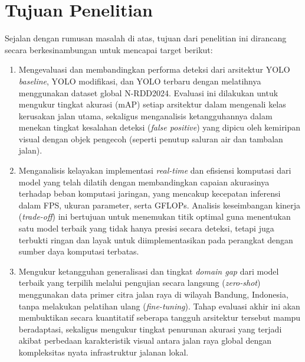 \section{Tujuan Penelitian}
Sejalan dengan rumusan masalah di atas, tujuan dari penelitian ini dirancang secara berkesinambungan untuk mencapai target berikut:
\begin{enumerate}
  \item Mengevaluasi dan membandingkan performa deteksi dari arsitektur YOLO \textit{baseline}, YOLO modifikasi, dan YOLO terbaru dengan melatihnya menggunakan dataset global N-RDD2024. Evaluasi ini dilakukan untuk mengukur tingkat akurasi (mAP) setiap arsitektur dalam mengenali kelas kerusakan jalan utama, sekaligus menganalisis ketangguhannya dalam menekan tingkat kesalahan deteksi (\textit{false positive}) yang dipicu oleh kemiripan visual dengan objek pengecoh (seperti penutup saluran air dan tambalan jalan).

  \item Menganalisis kelayakan implementasi \textit{real-time} dan efisiensi komputasi dari model yang telah dilatih dengan membandingkan capaian akurasinya terhadap beban komputasi jaringan, yang mencakup kecepatan inferensi dalam FPS, ukuran parameter, serta GFLOPs. Analisis keseimbangan kinerja (\textit{trade-off}) ini bertujuan untuk menemukan titik optimal guna menentukan satu model terbaik yang tidak hanya presisi secara deteksi, tetapi juga terbukti ringan dan layak untuk diimplementasikan pada perangkat dengan sumber daya komputasi terbatas.

  \item Mengukur ketangguhan generalisasi dan tingkat \textit{domain gap} dari model terbaik yang terpilih melalui pengujian secara langsung (\textit{zero-shot}) menggunakan data primer citra jalan raya di wilayah Bandung, Indonesia, tanpa melakukan pelatihan ulang (\textit{fine-tuning}). Tahap evaluasi akhir ini akan membuktikan secara kuantitatif seberapa tangguh arsitektur tersebut mampu beradaptasi, sekaligus mengukur tingkat penurunan akurasi yang terjadi akibat perbedaan karakteristik visual antara jalan raya global dengan kompleksitas nyata infrastruktur jalanan lokal.
\end{enumerate}

